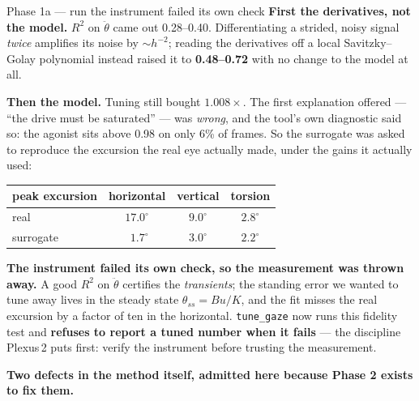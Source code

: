 \documentclass[11pt,a4paper]{article}
\newcommand{\code}[1]{\texttt{#1}}
\begin{document}
\begin{runbox}{Phase 1a --- run \hfill the instrument failed its own check}
\textbf{First the derivatives, not the model.} $R^2$ on $\ddot\theta$ came out 0.28--0.40.
Differentiating a strided, noisy signal \emph{twice} amplifies its noise by $\sim h^{-2}$; reading
the derivatives off a local Savitzky--Golay polynomial instead raised it to \textbf{0.48--0.72} with
no change to the model at all.

\textbf{Then the model.} Tuning still bought $1.008\times$. The first explanation offered --- ``the
drive must be saturated'' --- was \emph{wrong}, and the tool's own diagnostic said so: the agonist
sits above 0.98 on only 6\% of frames. So the surrogate was asked to reproduce the excursion the
real eye actually made, under the gains it actually used:

\begin{center}\small
\begin{tabular}{@{}lccc@{}}
\toprule
peak excursion & horizontal & vertical & torsion \\
\midrule
real            & $17.0^\circ$ & $9.0^\circ$ & $2.8^\circ$ \\
surrogate       & $\ \ 1.7^\circ$ & $3.0^\circ$ & $2.2^\circ$ \\
\bottomrule
\end{tabular}
\end{center}

\begin{tcolorbox}[colback=bad!4,colframe=bad!45,boxrule=0.7pt,arc=2pt]
\textbf{The instrument failed its own check, so the measurement was thrown away.} A good $R^2$ on
$\ddot\theta$ certifies the \emph{transients}; the standing error we wanted to tune away lives in
the steady state $\theta_{ss}=Bu/K$, and the fit misses the real excursion by a factor of ten in the
horizontal. \code{tune\_gaze} now runs this fidelity test and \textbf{refuses to report a tuned
number when it fails} --- the discipline Plexus\,2 puts first: verify the instrument before trusting
the measurement.
\end{tcolorbox}

\textbf{Two defects in the method itself, admitted here because Phase 2 exists to fix them.}


\end{runbox}
\end{document}

